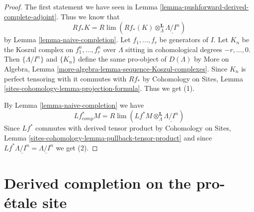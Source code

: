 \begin{proof}
The first statement we have seen in
Lemma \ref{lemma-pushforward-derived-complete-adjoint}.
Thus we know that
$$
Rf_*K = R\lim ( Rf_*(K) \otimes^\mathbf{L}_\Lambda \underline{\Lambda/I^n})
$$
by Lemma \ref{lemma-naive-completion}.
Let $f_1, \ldots, f_r$ be generators of $I$. Let $K_n$ be the
Koszul complex on $f_1^n, \ldots, f_r^n$ over $\Lambda$ sitting
in cohomological degrees $-r, \ldots, 0$. Then
$\{\Lambda/I^n\}$ and $\{K_n\}$ define the same pro-object of
$D(\Lambda)$ by
More on Algebra, Lemma \ref{more-algebra-lemma-sequence-Koszul-complexes}.
Since $K_n$ is perfect tensoring with it commutes with $Rf_*$ by
Cohomology on Sites, Lemma \ref{sites-cohomology-lemma-projection-formula}.
Thus we get (1).

\medskip\noindent
By Lemma \ref{lemma-naive-completion} we have
$$
Lf_{comp}^*M =
R\lim ( Lf^*M \otimes_\Lambda^\mathbf{L} \underline{\Lambda/I^n})
$$
Since $Lf^*$ commutes with derived tensor product by
Cohomology on Sites, Lemma \ref{sites-cohomology-lemma-pullback-tensor-product}
and since $Lf^*\underline{\Lambda/I^n} = \underline{\Lambda/I^n}$
we get (2).
\end{proof}






\section{Derived completion on the pro-\'etale site}
\label{section-derived-completion-proetale}

